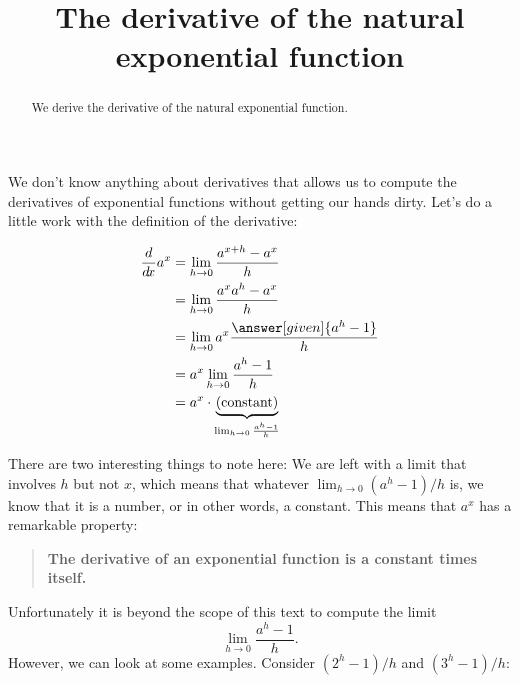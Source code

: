 \documentclass{ximera}
\title[Dig-In:]{The derivative of the natural exponential function}
\begin{document}
\begin{abstract}
  We derive the derivative of the natural exponential function.
\end{abstract}
\maketitle

We don't know anything about derivatives that allows us to compute the
derivatives of exponential functions without getting our hands
dirty. Let's do a little work with the definition of the derivative:
\begin{explanation}
\begin{align*}
\ddx a^x &=\lim_{h\to 0} \frac{a^{x+h}-a^x}{h} \\
&=\lim_{h\to 0} \frac{a^xa^{h}-a^x}{h} \\
&=\lim_{h\to 0} a^x\frac{\answer[given]{a^{h}-1}}{h} \\
&=a^x\lim_{h\to 0} \frac{a^{h}-1}{h} \\
&=a^x \cdot \underbrace{\text{(constant)}}_{\lim_{h\to 0} \frac{a^{h}-1}{h}}
\end{align*}
\end{explanation}
There are two interesting things to note here: We are left with a
limit that involves $h$ but not $x$, which means that whatever $
\lim_{h\to 0} (a^h-1)/h$ is, we know that it is a number, or in other words, a
constant. This means that $a^x$ has a remarkable property:
\begin{quote}
  \textbf{The derivative of an exponential function is a constant
    times itself.}
\end{quote}
Unfortunately it is beyond the scope of this text to compute the limit
\[
\lim_{h\to 0} \frac{a^h-1}{h}.
\]
However, we can look at some examples. Consider $(2^h-1)/h$ and $(3^h-1)/h$:
\end{document}
